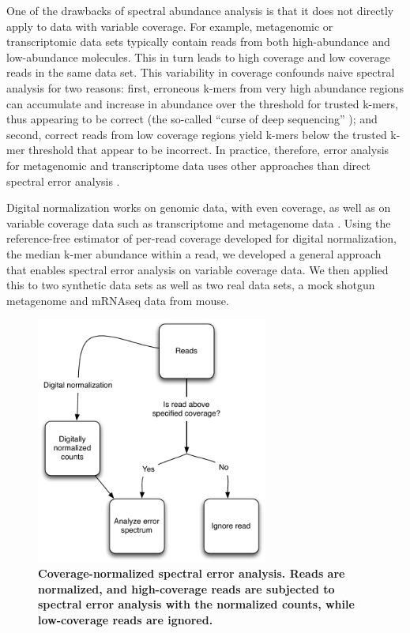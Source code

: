 \documentclass{article}
\begin{document}
One of the drawbacks of spectral
abundance analysis is that it does not directly apply to data with
variable coverage.  For example, metagenomic or transcriptomic data
sets typically contain reads from both high-abundance and
low-abundance molecules.  This in turn leads to high coverage and low
coverage reads in the same data set. This variability in coverage
confounds naive spectral analysis for two reasons: first, erroneous
k-mers from very high abundance regions can accumulate and increase in
abundance over the threshold for trusted k-mers, thus appearing to be
correct (the so-called ``curse of deep sequencing'' \cite{Roberts2011}); and second, correct reads from low coverage regions yield
k-mers below the trusted k-mer threshold that appear to be incorrect.
In practice, therefore, error analysis for metagenomic and
transcriptome data uses other approaches than direct spectral error
analysis \cite{Medvedev2011, seecer, freclu}.

Digital normalization works on genomic data, with even coverage, as
well as on variable coverage data such as transcriptome and metagenome
data \cite{Brown2012, Lowe2015, Howe2014}.  Using the reference-free estimator
of per-read coverage developed for digital normalization, the median
k-mer abundance within a read, we developed a general approach that
enables spectral error analysis on variable coverage data.  We then
applied this to two synthetic data sets as well as two real data sets,
a mock shotgun metagenome and mRNAseq data from mouse.

\begin{figure}[!ht]
 \centerline{\includegraphics[width=3in]{./figures/coverage-aware-spectrum}}
\caption{{\bf Coverage-normalized spectral error analysis.  Reads are
    normalized, and high-coverage reads are subjected to spectral
    error analysis with the normalized counts, while low-coverage
    reads are ignored.}}
\label{fig:covaware}
\end{figure}
\end{document}
